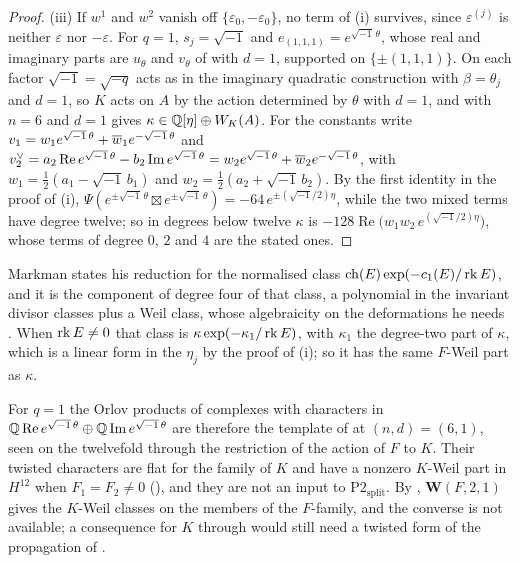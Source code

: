 \begin{proof}
(iii) If $w^{1}$ and $w^{2}$ vanish off $\{\varepsilon_{0},-\varepsilon_{0}\}$,
no term of (i) survives, since $\varepsilon^{(j)}$ is neither $\varepsilon$
nor $-\varepsilon$. For $q=1$, $s_{j}=\sqrt{-1}$ and
$e_{(1,1,1)}=e^{\sqrt{-1}\,\theta}$, whose real and imaginary parts are
$u_{\theta}$ and $v_{\theta}$ of \cite[(30)]{paperI} with $d=1$, supported on
$\{\pm(1,1,1)\}$. On each factor $\sqrt{-1}=\sqrt{-q}$ acts as in the
imaginary quadratic construction with $\beta=\theta_{j}$ and $d=1$, so $K$
acts on $A$ by the action \cite[(29)]{paperI} determined by $\theta$ with $d=1$,
and  with $n=6$ and $d=1$ gives
$\kappa\in\mathbb{Q}[\eta]\oplus W_{K}(A)$. For the constants write
$v_{1}=w_{1}e^{\sqrt{-1}\,\theta}+\overline{w}_{1}e^{-\sqrt{-1}\,\theta}$ and
$v_{2}^{\vee}=a_{2}\operatorname{Re}e^{\sqrt{-1}\,\theta}
-b_{2}\operatorname{Im}e^{\sqrt{-1}\,\theta}
=w_{2}e^{\sqrt{-1}\,\theta}+\overline{w}_{2}e^{-\sqrt{-1}\,\theta}$, with
$w_{1}=\frac12(a_{1}-\sqrt{-1}\,b_{1})$ and $w_{2}=\frac12(a_{2}+\sqrt{-1}\,
b_{2})$. By the first identity in the proof of (i),
$\Psi(e^{\pm\sqrt{-1}\,\theta}\boxtimes e^{\pm\sqrt{-1}\,\theta})
=-64\,e^{\pm(\sqrt{-1}/2)\eta}$, while the two mixed terms have degree
twelve; so in degrees below twelve $\kappa$ is
$-128\operatorname{Re}\bigl(w_{1}w_{2}\,e^{(\sqrt{-1}/2)\eta}\bigr)$, whose
terms of degree $0$, $2$ and $4$ are the stated ones.
\end{proof}

Markman states his reduction for the normalised class
$\operatorname{ch}(E)\exp(-c_{1}(E)/\operatorname{rk} E)$, and it is the component of degree four of that
class, a polynomial in the invariant divisor classes plus a Weil class, whose
algebraicity on the deformations he needs \cite[Proposition~10.2.1,
Corollary~10.2.3]{Mar25c}. When $\operatorname{rk} E\ne0$ that class is
$\kappa\exp(-\kappa_{1}/\operatorname{rk} E)$, with $\kappa_{1}$ the degree-two part of
$\kappa$, which is a linear form in the $\eta_{j}$ by the proof of
(i); so it has the same $F$-Weil part as $\kappa$.

For $q=1$ the Orlov products of complexes with characters in
$\mathbb{Q}\operatorname{Re}e^{\sqrt{-1}\,\theta}\oplus\mathbb{Q}\operatorname{Im}
e^{\sqrt{-1}\,\theta}$ are therefore the template of
 at $(n,d)=(6,1)$, seen on the twelvefold through the
restriction of the action of $F$ to $K$. Their twisted characters are flat
for the family of $K$ and have a nonzero $K$-Weil part in $H^{12}$ when
$F_{1}=F_{2}\ne0$ (), and they are not an input to
$\mathrm{P2}_{\mathrm{split}}$. By \cite[Proposition~17.10]{paperI}, $\mathbf{W}(F,2,1)$
gives the $K$-Weil classes on the members of the $F$-family, and the converse
is not available; a consequence for $K$ through \cite[Proposition~2.13]{paperIII} would
still need a twisted form of the propagation of .

